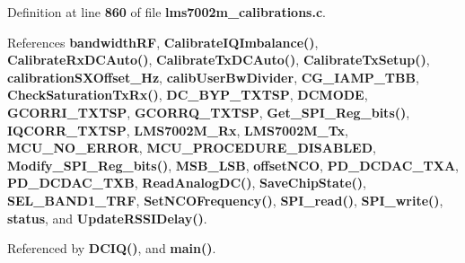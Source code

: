 Definition at line {\bf 860} of file {\bf lms7002m\+\_\+calibrations.\+c}.



References {\bf bandwidth\+RF}, {\bf Calibrate\+I\+Q\+Imbalance()}, {\bf Calibrate\+Rx\+D\+C\+Auto()}, {\bf Calibrate\+Tx\+D\+C\+Auto()}, {\bf Calibrate\+Tx\+Setup()}, {\bf calibration\+S\+X\+Offset\+\_\+\+Hz}, {\bf calib\+User\+Bw\+Divider}, {\bf C\+G\+\_\+\+I\+A\+M\+P\+\_\+\+T\+BB}, {\bf Check\+Saturation\+Tx\+Rx()}, {\bf D\+C\+\_\+\+B\+Y\+P\+\_\+\+T\+X\+T\+SP}, {\bf D\+C\+M\+O\+DE}, {\bf G\+C\+O\+R\+R\+I\+\_\+\+T\+X\+T\+SP}, {\bf G\+C\+O\+R\+R\+Q\+\_\+\+T\+X\+T\+SP}, {\bf Get\+\_\+\+S\+P\+I\+\_\+\+Reg\+\_\+bits()}, {\bf I\+Q\+C\+O\+R\+R\+\_\+\+T\+X\+T\+SP}, {\bf L\+M\+S7002\+M\+\_\+\+Rx}, {\bf L\+M\+S7002\+M\+\_\+\+Tx}, {\bf M\+C\+U\+\_\+\+N\+O\+\_\+\+E\+R\+R\+OR}, {\bf M\+C\+U\+\_\+\+P\+R\+O\+C\+E\+D\+U\+R\+E\+\_\+\+D\+I\+S\+A\+B\+L\+ED}, {\bf Modify\+\_\+\+S\+P\+I\+\_\+\+Reg\+\_\+bits()}, {\bf M\+S\+B\+\_\+\+L\+SB}, {\bf offset\+N\+CO}, {\bf P\+D\+\_\+\+D\+C\+D\+A\+C\+\_\+\+T\+XA}, {\bf P\+D\+\_\+\+D\+C\+D\+A\+C\+\_\+\+T\+XB}, {\bf Read\+Analog\+D\+C()}, {\bf Save\+Chip\+State()}, {\bf S\+E\+L\+\_\+\+B\+A\+N\+D1\+\_\+\+T\+RF}, {\bf Set\+N\+C\+O\+Frequency()}, {\bf S\+P\+I\+\_\+read()}, {\bf S\+P\+I\+\_\+write()}, {\bf status}, and {\bf Update\+R\+S\+S\+I\+Delay()}.



Referenced by {\bf D\+C\+I\+Q()}, and {\bf main()}.



